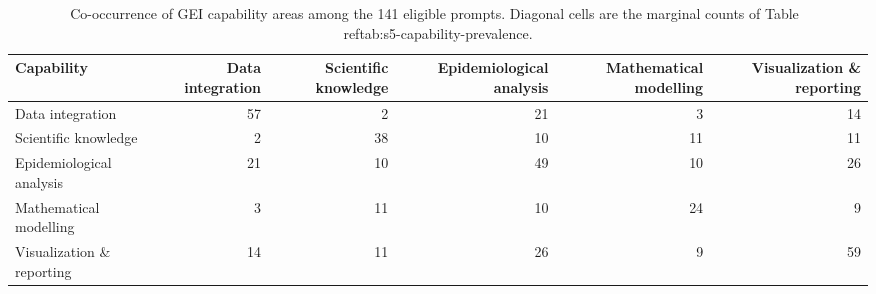 \begin{table}[htbp]
\centering
\caption{Co-occurrence of GEI capability areas among the 141 eligible prompts. Diagonal cells are the marginal counts of Table~\\ref{tab:s5-capability-prevalence}.}
\label{tab:s5-cooccurrence}
\begin{tabular}{lrrrrr}
\toprule
Capability & Data integration & Scientific knowledge & Epidemiological analysis & Mathematical modelling & Visualization \& reporting \\
\midrule
Data integration & 57 & 2 & 21 & 3 & 14 \\
Scientific knowledge & 2 & 38 & 10 & 11 & 11 \\
Epidemiological analysis & 21 & 10 & 49 & 10 & 26 \\
Mathematical modelling & 3 & 11 & 10 & 24 & 9 \\
Visualization \& reporting & 14 & 11 & 26 & 9 & 59 \\
\bottomrule
\end{tabular}
\par{}
\end{table}
